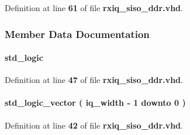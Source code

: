 Definition at line {\bf 61} of file {\bf rxiq\+\_\+siso\+\_\+ddr.\+vhd}.



\subsubsection{Member Data Documentation}
\paragraph[{diq\+\_\+pos0\+\_\+1\+\_\+cap\+\_\+en}]{ {\bfseries \textcolor{comment}{std\+\_\+logic}\textcolor{vhdlchar}{ }} \hspace{0.3cm}{\ttfamily [Signal]}}\label{classrxiq__siso__ddr_1_1arch_aea68ab33d88dad447fbeff9654dddc2d}


Definition at line {\bf 47} of file {\bf rxiq\+\_\+siso\+\_\+ddr.\+vhd}.

\paragraph[{diq\+\_\+pos0\+\_\+reg}]{ {\bfseries \textcolor{comment}{std\+\_\+logic\+\_\+vector}\textcolor{vhdlchar}{ }\textcolor{vhdlchar}{(}\textcolor{vhdlchar}{ }\textcolor{vhdlchar}{ }\textcolor{vhdlchar}{ }\textcolor{vhdlchar}{ }{\bfseries {\bf iq\+\_\+width}} \textcolor{vhdlchar}{-\/}\textcolor{vhdlchar}{ } \textcolor{vhdldigit}{1} \textcolor{vhdlchar}{ }\textcolor{keywordflow}{downto}\textcolor{vhdlchar}{ }\textcolor{vhdlchar}{ } \textcolor{vhdldigit}{0} \textcolor{vhdlchar}{ }\textcolor{vhdlchar}{)}\textcolor{vhdlchar}{ }} \hspace{0.3cm}{\ttfamily [Signal]}}\label{classrxiq__siso__ddr_1_1arch_a90f7e1d1da4f84ab94cdd3dbfcac8837}


Definition at line {\bf 42} of file {\bf rxiq\+\_\+siso\+\_\+ddr.\+vhd}.

